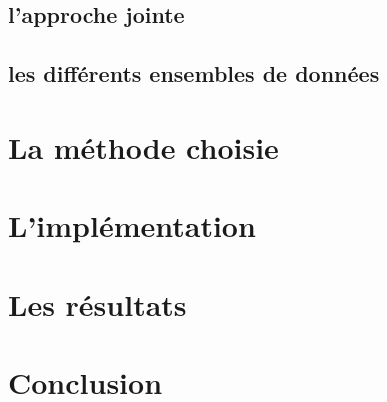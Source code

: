 \documentclass{article}
\begin{document}
\subsection{l'approche jointe}

\subsection{les différents ensembles de données}

\section{La méthode choisie}

\section{L'implémentation}

\section{Les résultats}

\section{Conclusion}
\end{document}
